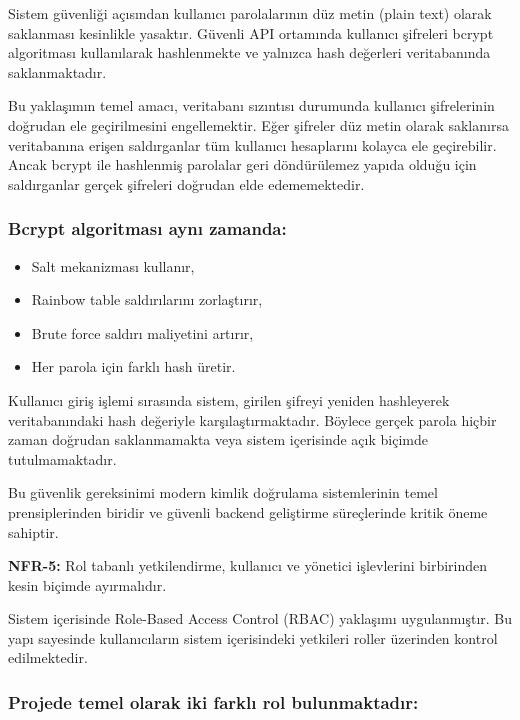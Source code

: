 Sistem güvenliği açısından kullanıcı parolalarının düz metin (plain text) olarak saklanması kesinlikle yasaktır. Güvenli API ortamında kullanıcı şifreleri bcrypt algoritması kullanılarak hashlenmekte ve yalnızca hash değerleri veritabanında saklanmaktadır.

Bu yaklaşımın temel amacı, veritabanı sızıntısı durumunda kullanıcı şifrelerinin doğrudan ele geçirilmesini engellemektir. Eğer şifreler düz metin olarak saklanırsa veritabanına erişen saldırganlar tüm kullanıcı hesaplarını kolayca ele geçirebilir. Ancak bcrypt ile hashlenmiş parolalar geri döndürülemez yapıda olduğu için saldırganlar gerçek şifreleri doğrudan elde edememektedir.

\subsubsection{Bcrypt algoritması aynı zamanda:}

\begin{itemize}[leftmargin=*]
    \item Salt mekanizması kullanır,
    \item Rainbow table saldırılarını zorlaştırır,
    \item Brute force saldırı maliyetini artırır,
    \item Her parola için farklı hash üretir.
\end{itemize}

Kullanıcı giriş işlemi sırasında sistem, girilen şifreyi yeniden hashleyerek veritabanındaki hash değeriyle karşılaştırmaktadır. Böylece gerçek parola hiçbir zaman doğrudan saklanmamakta veya sistem içerisinde açık biçimde tutulmamaktadır.

Bu güvenlik gereksinimi modern kimlik doğrulama sistemlerinin temel prensiplerinden biridir ve güvenli backend geliştirme süreçlerinde kritik öneme sahiptir.

\noindent\textbf{NFR-5:} Rol tabanlı yetkilendirme, kullanıcı ve yönetici işlevlerini birbirinden kesin biçimde ayırmalıdır.

Sistem içerisinde Role-Based Access Control (RBAC) yaklaşımı uygulanmıştır. Bu yapı sayesinde kullanıcıların sistem içerisindeki yetkileri roller üzerinden kontrol edilmektedir.

\subsubsection{Projede temel olarak iki farklı rol bulunmaktadır:}

